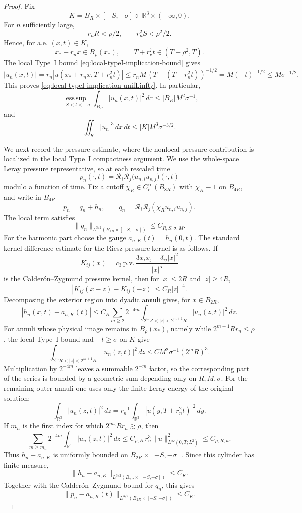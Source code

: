 \documentclass[11pt]{amsart}
\numberwithin{equation}{section}
\theoremstyle{plain}
\theoremstyle{definition}
\theoremstyle{remark}
\newcommand{\R}{\mathbb R}
\newcommand{\esssup}{\operatorname*{ess\,sup}}
\begin{document}
\begin{proof}
Fix
\[
   K=B_R\times[-S,-\sigma]\Subset\R^3\times(-\infty,0).
\]
For \(n\) sufficiently large,
\[
   r_nR<\rho/2,\qquad r_n^2S<\rho^2/2.
\]
Hence, for a.e. \((x,t)\in K\),
\[
   x_*+r_nx\in B_\rho(x_*),
   \qquad
   T+r_n^2t\in(T-\rho^2,T).
\]
The local Type~I bound \eqref{eq:local-typeI-implication-bound} gives
\[
   |u_n(x,t)|
   =r_n|u(x_*+r_nx,T+r_n^2t)|
   \le r_n M\,(T-(T+r_n^2t))^{-1/2}
   =M(-t)^{-1/2}
   \le M\sigma^{-1/2}.
\]
This proves \eqref{eq:local-typeI-implication-unifLinfty}.  In particular,
\[
   \esssup_{-S<t<-\sigma}\int_{B_R}|u_n(x,t)|^2\,dx
   \le |B_R|M^2\sigma^{-1},
\]
and
\[
   \iint_K |u_n|^3\,dx\,dt
   \le |K|M^3\sigma^{-3/2}.
\]

We next record the pressure estimate, where the nonlocal pressure contribution
is localized in the local Type~I compactness argument.  We use the whole-space
Leray pressure representative, so at each rescaled time
\[
   p_n(\cdot,t)=\mathcal R_i\mathcal R_j
      \bigl(u_{n,i}u_{n,j}\bigr)(\cdot,t)
\]
modulo a function of time.  Fix a cutoff
\(\chi_R\in C_c^\infty(B_{8R})\) with \(\chi_R\equiv1\) on \(B_{4R}\), and
write in \(B_{4R}\)
\[
   p_n=q_n+h_n,\qquad
   q_n=\mathcal R_i\mathcal R_j(\chi_R u_{n,i}u_{n,j}).
\]
The local term satisfies
\[
   \|q_n\|_{L^{3/2}(B_{4R}\times[-S,-\sigma])}
   \le C_{R,S,\sigma,M}.
\]
For the harmonic part choose the gauge \(a_{n,K}(t)=h_n(0,t)\).  The standard
kernel difference estimate for the Riesz pressure kernel is as follows.  If
\[
   K_{ij}(x)=c_3\,\mathrm{p.v.}\,
      \frac{3x_ix_j-\delta_{ij}|x|^2}{|x|^5}
\]
is the Calder\'on--Zygmund pressure kernel, then for \(|x|\le2R\) and
\(|z|\ge4R\),
\[
   |K_{ij}(x-z)-K_{ij}(-z)|\le C_R|z|^{-4}.
\]
Decomposing the exterior region into dyadic annuli gives, for \(x\in B_{2R}\),
\[
   |h_n(x,t)-a_{n,K}(t)|
   \le
   C_R\sum_{m\ge2}2^{-4m}
   \int_{2^mR<|z|<2^{m+1}R}|u_n(z,t)|^2\,dz .
\]
For annuli whose physical image remains in \(B_\rho(x_*)\), namely while
\(2^{m+1}Rr_n\le\rho\), the local Type~I bound and \(-t\ge\sigma\) on \(K\)
give
\[
   \int_{2^mR<|z|<2^{m+1}R}|u_n(z,t)|^2\,dz
   \le C M^2\sigma^{-1}(2^mR)^3 .
\]
Multiplication by \(2^{-4m}\) leaves a summable \(2^{-m}\) factor, so the
corresponding part of the series is bounded by a geometric sum depending only
on \(R,M,\sigma\).  For the remaining outer annuli one uses only the finite
Leray energy of the original solution:
\[
   \int_{\R^3}|u_n(z,t)|^2\,dz
   =r_n^{-1}\int_{\R^3}|u(y,T+r_n^2t)|^2\,dy .
\]
If \(m_n\) is the first index for which \(2^{m_n}Rr_n\gtrsim\rho\), then
\[
   \sum_{m\ge m_n}2^{-4m}\int_{\R^3}|u_n(z,t)|^2\,dz
   \le
   C_{\rho,R}\,r_n^3\|u\|_{L^\infty(0,T;L^2)}^2
   \le C_{\rho,R,u}.
\]
Thus \(h_n-a_{n,K}\) is uniformly bounded on
\(B_{2R}\times[-S,-\sigma]\).  Since this cylinder has finite measure,
\[
   \|h_n-a_{n,K}\|_{L^{3/2}(B_{2R}\times[-S,-\sigma])}
   \le C_K .
\]
Together with the Calder\'on--Zygmund bound for \(q_n\), this gives
\[
   \|p_n-a_{n,K}(t)\|_{L^{3/2}(B_{2R}\times[-S,-\sigma])}
   \le C_K .
\]


\end{proof}
\end{document}
